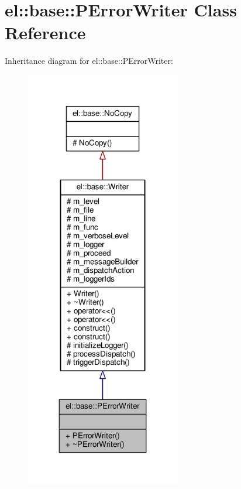 \hypertarget{classel_1_1base_1_1PErrorWriter}{}\section{el\+:\+:base\+:\+:P\+Error\+Writer Class Reference}
\label{classel_1_1base_1_1PErrorWriter}


Inheritance diagram for el\+:\+:base\+:\+:P\+Error\+Writer\+:
\nopagebreak
\begin{figure}[H]
\begin{center}
\leavevmode
\includegraphics[width=191pt]{df/d1e/classel_1_1base_1_1PErrorWriter__inherit__graph}
\end{center}
\end{figure}


